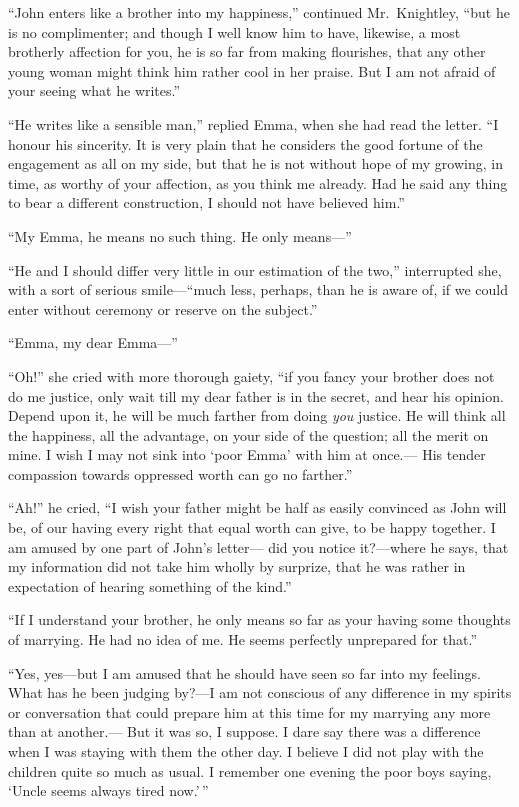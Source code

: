 ``John enters like a brother into my happiness,'' continued Mr.\ Knightley,
``but he is no complimenter; and though I well know him to have,
likewise, a most brotherly affection for you, he is so far from
making flourishes, that any other young woman might think him rather
cool in her praise.  But I am not afraid of your seeing what he writes.''

``He writes like a sensible man,'' replied Emma, when she had read
the letter.  ``I honour his sincerity.  It is very plain that he
considers the good fortune of the engagement as all on my side,
but that he is not without hope of my growing, in time, as worthy
of your affection, as you think me already.  Had he said any thing
to bear a different construction, I should not have believed him.''

``My Emma, he means no such thing.  He only means---''

``He and I should differ very little in our estimation of the two,''
interrupted she, with a sort of serious smile---``much less, perhaps,
than he is aware of, if we could enter without ceremony or reserve
on the subject.''

``Emma, my dear Emma---''

``Oh!'' she cried with more thorough gaiety, ``if you fancy your
brother does not do me justice, only wait till my dear father is in
the secret, and hear his opinion.  Depend upon it, he will be much
farther from doing \emph{you} justice.  He will think all the happiness,
all the advantage, on your side of the question; all the merit
on mine.  I wish I may not sink into `poor Emma' with him at once.---%
His tender compassion towards oppressed worth can go no farther.''

``Ah!'' he cried, ``I wish your father might be half as easily convinced
as John will be, of our having every right that equal worth can give,
to be happy together.  I am amused by one part of John's letter---%
did you notice it?---where he says, that my information did not take
him wholly by surprize, that he was rather in expectation of hearing
something of the kind.''

``If I understand your brother, he only means so far as your having
some thoughts of marrying.  He had no idea of me.  He seems perfectly
unprepared for that.''

``Yes, yes---but I am amused that he should have seen so far into
my feelings.  What has he been judging by?---I am not conscious
of any difference in my spirits or conversation that could prepare
him at this time for my marrying any more than at another.---%
But it was so, I suppose.  I dare say there was a difference when I
was staying with them the other day.  I believe I did not play
with the children quite so much as usual.  I remember one evening
the poor boys saying, `Uncle seems always tired now.'\,''

